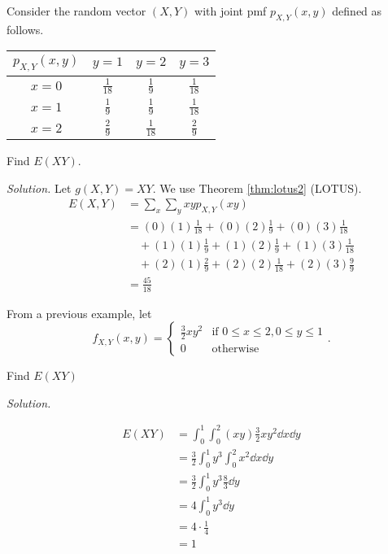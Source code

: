 \begin{example}[]
	Consider the random vector $(X,Y)$ with joint pmf $p_{X,Y}(x,y)$ defined as follows.

	\begin{center}
	\begin{tabular}{c | c c c}
		$p_{X,Y}(x,y)$ & $y=1$ & $y=2$ & $y=3$\\ \hline
		$x=0$ & $\frac{1}{18}$ & $\frac{1}{9}$ & $\frac{1}{18}$\\
		$x=1$ & $\frac{1}{9}$ & $\frac{1}{9}$ & $\frac{1}{18}$\\
		$x=2$ & $\frac{2}{9}$ & $\frac{1}{18}$ & $\frac{2}{9}$
	\end{tabular}
	\end{center}

	Find $E(XY)$.

	\textit{Solution.} Let $g(X,Y)=XY$. We use Theorem \ref{thm:lotus2} (LOTUS).
	\begin{align*}
		E(X,Y)&=\sum_{x}\sum_{y}xyp_{X,Y}(xy)\\
		&=(0)(1)\frac{1}{18}+(0)(2)\frac{1}{9}+(0)(3)\frac{1}{18}\\
		&\quad +(1)(1)\frac{1}{9}+(1)(2)\frac{1}{9}+(1)(3)\frac{1}{18}\\
		&\quad +(2)(1)\frac{2}{9}+(2)(2)\frac{1}{18}+(2)(3)\frac{9}{9}\\
		&=\frac{45}{18}
	\end{align*}
\end{example}

\begin{example}[]
	From a previous example, let $$f_{X,Y}(x,y)=\begin{cases}
		\frac 32xy^2 & \text{if } 0\leq x\leq 2,0\leq y\leq 1\\
		0 & \text{otherwise}
	\end{cases}.$$

	Find $E(XY)$

	\textit{Solution.}

	\begin{align*}
		E(XY)&=\int_0^1\int_0^2(xy)\frac 32xy^2\dd x\dd y\\
		&=\frac 32\int_0^1y^3\int_0^2x^2\dd x\dd y\\
		&=\frac 32\int_0^1y^3\frac 83\dd y\\
		&=4\int_0^1y^3\dd y\\
		&=4\cdot\frac 14\\
		&=1
	\end{align*}
\end{example}

